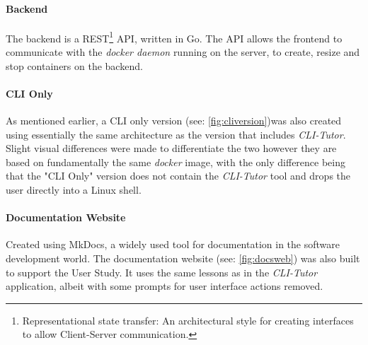 \paragraph{Backend} The backend is a REST\footnote{Representational state
transfer: An architectural style for creating interfaces to allow Client-Server
communication.} API, written in Go. The API allows the frontend to communicate
with the \textit{docker daemon} running on the server, to create,
resize and stop containers on the backend.
 
\paragraph{CLI Only} As mentioned earlier, a CLI only version (see: \autoref{fig:cliversion})was also created
using essentially the same architecture as the version that includes
\textit{CLI-Tutor}. Slight visual differences were made to differentiate the
two however they are based on fundamentally the same \textit{docker} image, with
the only difference being that the "CLI Only" version does not contain the
\textit{CLI-Tutor} tool and drops the user directly into a Linux shell.

\paragraph{Documentation Website} Created using MkDocs,\cite{mkdocs} a widely
used tool for documentation in the software development world. The
documentation website (see: \autoref{fig:docsweb}) was also built to support the
User Study. It uses the same lessons as in the \textit{CLI-Tutor}
application, albeit with some prompts for user interface actions removed.

